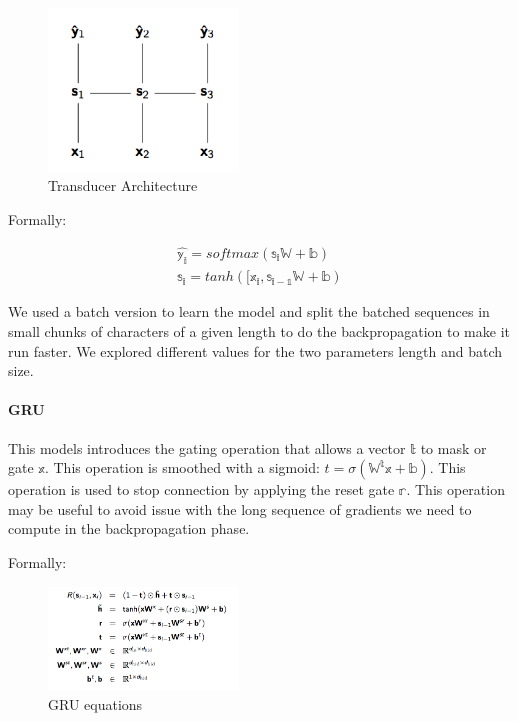 \documentclass[11pt]{article}
\begin{document}
\begin{figure}[H]
\begin{center}
    \includegraphics[width=0.45\textwidth]{transducer.png}
    \caption{Transducer Architecture}
\end{center}
\end{figure}

Formally:

\begin{align*}
\mathbb{\hat{y_i}} = softmax(\mathbb{s_i} \mathbb{W} + \mathbb{b}) \\
\mathbb{s_i} = tanh( [\mathbb{x_i}, \mathbb{s_{i-1}}\mathbb{W} + \mathbb{b})
\end{align*}

We used a batch version to learn the model and split the batched sequences in small chunks of characters of a given length to do the backpropagation to make it run faster. We explored different values for the two parameters length and batch size. 


\paragraph{GRU}

This models introduces the gating operation that allows a vector $\mathbb{t}$ to mask or gate $\mathbb{x}$. This operation is smoothed with a sigmoid: $t = \sigma(\mathbb{W^t}\mathbb{x} + \mathbb{b})$. This operation is used to stop connection by applying the reset gate $\mathbb{r}$. This operation may be useful to avoid issue with the long sequence of gradients we need to compute in the backpropagation phase.

Formally:

\begin{figure}[H]
\begin{center}
    \includegraphics[width=0.45\textwidth]{gru.png}
    \caption{GRU equations}
\end{center}
\end{figure}
\end{document}
